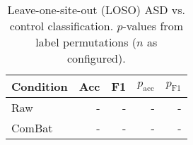 \begin{table}[t]
\centering
\setlength{\tabcolsep}{6pt}
\begin{tabular}{lrrrr}
\toprule
Condition & Acc & F1 & $p_{\mathrm{acc}}$ & $p_{\mathrm{F1}}$ \\
\midrule
Raw & - & - & - & - \\
ComBat & - & - & - & - \\
\bottomrule
\end{tabular}
\caption{Leave-one-site-out (LOSO) ASD vs. control classification. $p$-values from label permutations ($n$ as configured).}
\label{tab:loso}
\end{table}